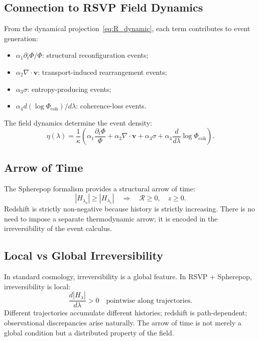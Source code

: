 \documentclass[12pt,a4paper]{article}
\theoremstyle{remark}
\newcommand{\vv}{\mathbf{v}}
\newcommand{\Rcal}{\mathcal{R}}
\begin{document}
\subsection{Connection to RSVP Field Dynamics}

From the dynamical projection~\eqref{eq:R_dynamic}, each term contributes to event generation:
\begin{itemize}[leftmargin=2em]
\item $\alpha_1 \partial_t\Phi/\Phi$: structural reconfiguration events;
\item $\alpha_2 \nabla\cdot\vv$: transport-induced rearrangement events;
\item $\alpha_3\sigma$: entropy-producing events;
\item $\alpha_4 d(\log\Phi_{\mathrm{coh}})/d\lambda$: coherence-loss events.
\end{itemize}
The field dynamics determine the event density:
\begin{equation}
\eta(\lambda) = \frac{1}{\kappa}\left(\alpha_1\frac{\partial_t\Phi}{\Phi} + \alpha_2\nabla\cdot\vv + \alpha_3\sigma + \alpha_4\frac{d}{d\lambda}\log\Phi_{\mathrm{coh}}\right).
\end{equation}

\subsection{Arrow of Time}

The Spherepop formalism provides a structural arrow of time:
\begin{equation}
|H_{\lambda_o}| \ge |H_{\lambda_e}| \quad\Longrightarrow\quad \Rcal \ge 0, \quad z \ge 0.
\end{equation}
Redshift is strictly non-negative because history is strictly increasing. There is no need to impose a separate thermodynamic arrow; it is encoded in the irreversibility of the event calculus.

\subsection{Local vs Global Irreversibility}

In standard cosmology, irreversibility is a global feature. In RSVP + Spherepop, irreversibility is local:
\begin{equation}
\frac{d|H_\lambda|}{d\lambda} > 0 \quad\text{pointwise along trajectories.}
\end{equation}
Different trajectories accumulate different histories; redshift is path-dependent; observational discrepancies arise naturally. The arrow of time is not merely a global condition but a distributed property of the field.
\end{document}

